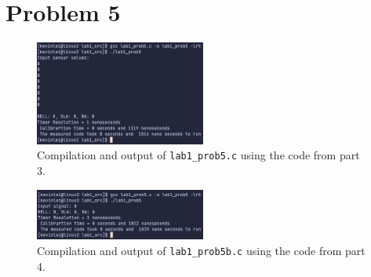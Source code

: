 \documentclass{article}
\begin{document}
\section{Problem 5}

\begin{figure}[H]
    \centering
    \includegraphics[width=0.5\textwidth]{./images/prob5part1.png}
    \caption{Compilation and output of \lstinline!lab1_prob5.c! using the code from part 3.}
\end{figure}

\begin{figure}[H]
    \centering
    \includegraphics[width=0.5\textwidth]{./images/prob5part2.png}
    \caption{Compilation and output of \lstinline!lab1_prob5b.c! using the code from part 4.}
\end{figure}
\end{document}
